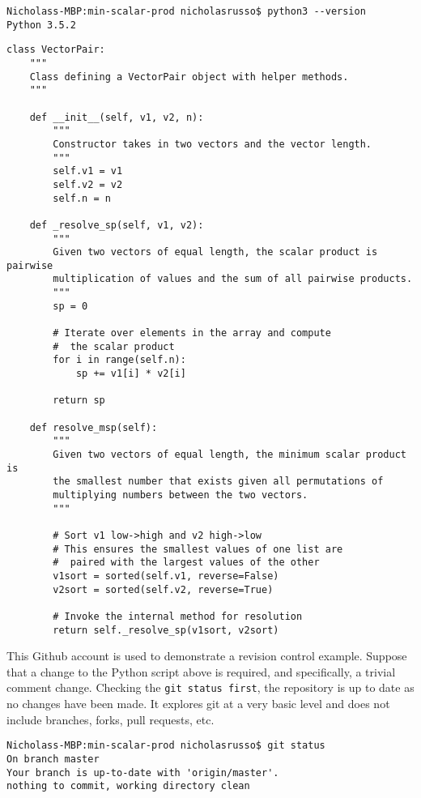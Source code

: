 \begin{verbatim}
Nicholass-MBP:min-scalar-prod nicholasrusso$ python3 --version
Python 3.5.2
\end{verbatim}

\begin{verbatim}
class VectorPair:
    """
	Class defining a VectorPair object with helper methods.
	"""

    def __init__(self, v1, v2, n):
        """
        Constructor takes in two vectors and the vector length.
        """
        self.v1 = v1
        self.v2 = v2
        self.n = n

    def _resolve_sp(self, v1, v2):
        """
        Given two vectors of equal length, the scalar product is pairwise
        multiplication of values and the sum of all pairwise products.
        """
        sp = 0

        # Iterate over elements in the array and compute
        #  the scalar product
        for i in range(self.n):
            sp += v1[i] * v2[i]

        return sp

    def resolve_msp(self):
        """
        Given two vectors of equal length, the minimum scalar product is
        the smallest number that exists given all permutations of
        multiplying numbers between the two vectors.
        """

        # Sort v1 low->high and v2 high->low
        # This ensures the smallest values of one list are
        #  paired with the largest values of the other
        v1sort = sorted(self.v1, reverse=False)
        v2sort = sorted(self.v2, reverse=True)

        # Invoke the internal method for resolution
        return self._resolve_sp(v1sort, v2sort)
\end{verbatim}

This Github account is used to demonstrate a revision
control example. Suppose that a change to the Python script above is required,
and specifically, a trivial comment change. Checking the \verb|git status first|,
the repository is up to date as no changes have been made. It explores git at
a very basic level and does not include branches, forks, pull requests, etc.

\begin{verbatim}
Nicholass-MBP:min-scalar-prod nicholasrusso$ git status
On branch master
Your branch is up-to-date with 'origin/master'.
nothing to commit, working directory clean
\end{verbatim}

